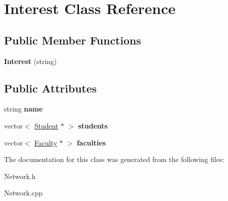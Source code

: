 \hypertarget{classInterest}{\section{\-Interest \-Class \-Reference}
\label{classInterest}
}
\subsection*{\-Public \-Member \-Functions}
\begin{DoxyCompactItemize}
\item 
\hypertarget{classInterest_afe951384215fa686be3e3c396f0dad73}{{\bfseries \-Interest} (string)}\label{classInterest_afe951384215fa686be3e3c396f0dad73}

\end{DoxyCompactItemize}
\subsection*{\-Public \-Attributes}
\begin{DoxyCompactItemize}
\item 
\hypertarget{classInterest_a9da31ac749fa5567497efa03a4bcec5a}{string {\bfseries name}}\label{classInterest_a9da31ac749fa5567497efa03a4bcec5a}

\item 
\hypertarget{classInterest_a133bf1a173ee435db5d752a59b7a0a13}{vector$<$ \hyperlink{classStudent}{\-Student} $\ast$ $>$ {\bfseries students}}\label{classInterest_a133bf1a173ee435db5d752a59b7a0a13}

\item 
\hypertarget{classInterest_a24d040a56210f88e945e8e7fa6ed8a17}{vector$<$ \hyperlink{classFaculty}{\-Faculty} $\ast$ $>$ {\bfseries faculties}}\label{classInterest_a24d040a56210f88e945e8e7fa6ed8a17}

\end{DoxyCompactItemize}


\-The documentation for this class was generated from the following files\-:\begin{DoxyCompactItemize}
\item 
\-Network.\-h\item 
\-Network.\-cpp\end{DoxyCompactItemize}
